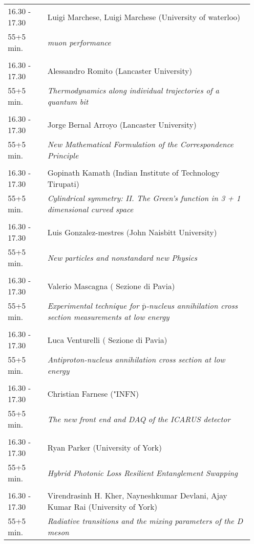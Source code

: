 \begin{longtable}{p{3cm}p{13cm}}
16.30 - 17.30 & Luigi Marchese, Luigi Marchese (University of waterloo)\\ 
55+5 min. & {\it muon performance}\\ 
 & \\ 
16.30 - 17.30 & Alessandro Romito (Lancaster University)\\ 
55+5 min. & {\it Thermodynamics along individual trajectories of a quantum bit}\\ 
 & \\ 
16.30 - 17.30 & Jorge Bernal Arroyo (Lancaster University)\\ 
55+5 min. & {\it New Mathematical Formulation of the Correspondence Principle}\\ 
 & \\ 
16.30 - 17.30 & Gopinath Kamath (Indian Institute of Technology Tirupati)\\ 
55+5 min. & {\it Cylindrical symmetry: II. The Green’s function in 3 + 1 dimensional curved space}\\ 
 & \\ 
16.30 - 17.30 & Luis Gonzalez-mestres (John Naisbitt University)\\ 
55+5 min. & {\it New particles and nonstandard new Physics}\\ 
 & \\ 
16.30 - 17.30 & Valerio Mascagna ( Sezione di Pavia)\\ 
55+5 min. & {\it Experimental technique for $\mathrm{\bar{p}}$-nucleus annihilation cross section measurements at low energy}\\ 
 & \\ 
16.30 - 17.30 & Luca Venturelli ( Sezione di Pavia)\\ 
55+5 min. & {\it Antiproton-nucleus annihilation cross section at low energy}\\ 
 & \\ 
16.30 - 17.30 & Christian Farnese ("INFN)\\ 
55+5 min. & {\it The new front end and DAQ of the ICARUS detector}\\ 
 & \\ 
16.30 - 17.30 & Ryan Parker (University of York)\\ 
55+5 min. & {\it Hybrid Photonic Loss Resilient Entanglement Swapping}\\ 
 & \\ 
16.30 - 17.30 & Virendrasinh H. Kher, Nayneshkumar Devlani, Ajay Kumar Rai (University of York)\\ 
55+5 min. & {\it Radiative transitions and the mixing parameters of the D meson}\\ 

\end{longtable}
